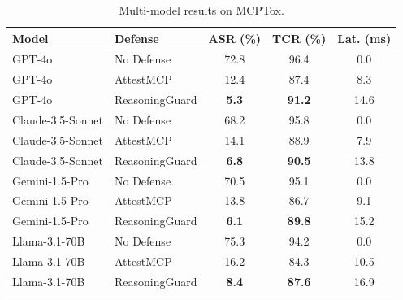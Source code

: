 \begin{table}[t]
\centering\small
\begin{tabular}{llccc}
\toprule
\textbf{Model} & \textbf{Defense} & \textbf{ASR (\%)} & \textbf{TCR (\%)} & \textbf{Lat. (ms)} \\
\midrule
GPT-4o & No Defense & {72.8} & {96.4} & 0.0 \\
GPT-4o & AttestMCP & {12.4} & {87.4} & 8.3 \\
GPT-4o & ReasoningGuard & \textbf{5.3} & \textbf{91.2} & 14.6 \\
Claude-3.5-Sonnet & No Defense & {68.2} & {95.8} & 0.0 \\
Claude-3.5-Sonnet & AttestMCP & {14.1} & {88.9} & 7.9 \\
Claude-3.5-Sonnet & ReasoningGuard & \textbf{6.8} & \textbf{90.5} & 13.8 \\
Gemini-1.5-Pro & No Defense & {70.5} & {95.1} & 0.0 \\
Gemini-1.5-Pro & AttestMCP & {13.8} & {86.7} & 9.1 \\
Gemini-1.5-Pro & ReasoningGuard & \textbf{6.1} & \textbf{89.8} & 15.2 \\
Llama-3.1-70B & No Defense & {75.3} & {94.2} & 0.0 \\
Llama-3.1-70B & AttestMCP & {16.2} & {84.3} & 10.5 \\
Llama-3.1-70B & ReasoningGuard & \textbf{8.4} & \textbf{87.6} & 16.9 \\
\bottomrule
\end{tabular}
\caption{Multi-model results on MCPTox.}
\label{tab:multi_model}
\end{table}